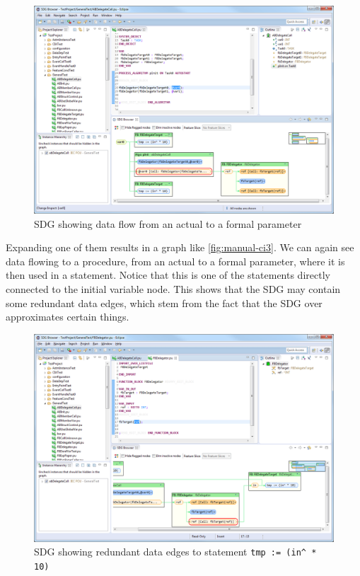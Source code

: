 \begin{figure}[hpb]
  \centering
    \includegraphics[width=\textwidth]{bilder/manual-ci2}
  \caption{SDG showing data flow from an actual to a formal parameter}
  \label{fig:manual-ci2}
\end{figure}

Expanding one of them results in a graph like \autoref{fig:manual-ci3}. We can again see data flowing to a procedure, 
from an actual to a formal parameter, where it is then used in a statement. Notice that this is one of the statements 
directly connected to the initial variable node. This shows that the SDG may contain some redundant data edges, which 
stem from the fact that the SDG over approximates certain things.

\begin{figure}[hpb]
  \centering
    \includegraphics[width=\textwidth]{bilder/manual-ci3}
  \caption[SDG showing redundant data edges]
    {SDG showing redundant data edges to statement \lstinline|tmp := (in^ * 10)|}
  \label{fig:manual-ci3}
\end{figure}

